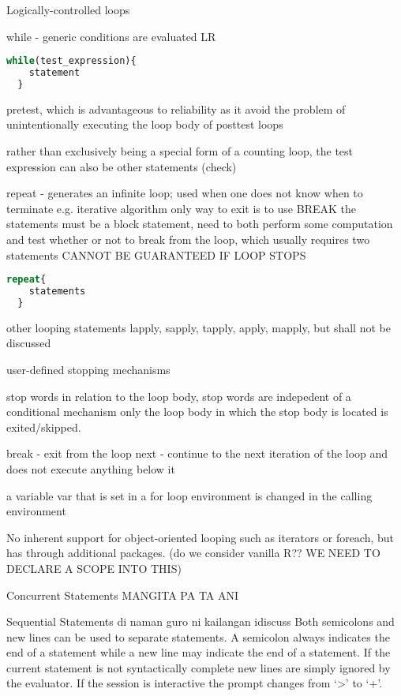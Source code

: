 \documentclass[12pt]{article}
\begin{document}
Logically-controlled loops

while - generic
conditions are evaluated LR

\begin{lstlisting}[language=R]
  while(test_expression){
    statement
  }
\end{lstlisting}

pretest, which is advantageous to reliability as it avoid the problem of unintentionally executing the loop body of posttest loops

rather than exclusively being a special form of a counting loop, the test expression can also be other statements (check)

repeat - generates an infinite loop; used when one does not know when to terminate e.g. iterative algorithm
only way to exit is to use BREAK
the statements must be a block statement, need to both perform some computation and test whether or not to break from the loop, which usually requires two statements
CANNOT BE GUARANTEED IF LOOP STOPS

\begin{lstlisting}[language=R]
  repeat{
    statements
  }
\end{lstlisting}


other looping statements
lapply, sapply, tapply, apply, mapply, but shall not be discussed

user-defined stopping mechanisms

stop words
in relation to the loop body, stop words are indepedent of a conditional mechanism
only the loop body in which the stop body is located is exited/skipped.

break - exit from the loop
next - continue to the next iteration of the loop and does not execute anything below it

a variable var that is set in a for loop environment is changed in the calling environment

No inherent support for object-oriented looping such as iterators or foreach, but has through additional packages. (do we consider vanilla R?? WE NEED TO DECLARE A SCOPE INTO THIS)

Concurrent Statements
MANGITA PA TA ANI

Sequential Statements di naman guro ni kailangan idiscuss
Both semicolons and new lines can be used to separate statements. A semicolon always
indicates the end of a statement while a new line may indicate the end of a statement. If the
current statement is not syntactically complete new lines are simply ignored by the evaluator.
If the session is interactive the prompt changes from ‘>’ to ‘+’.
\end{document}
